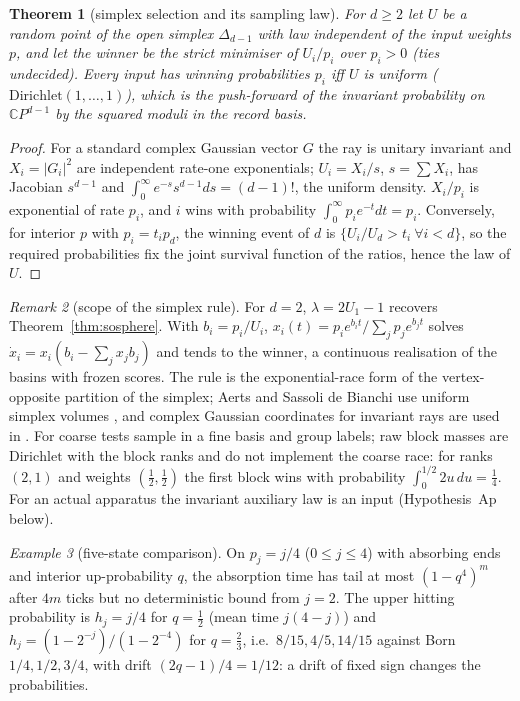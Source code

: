 \documentclass[aps,pra,onecolumn,superscriptaddress,nofootinbib,10pt]{revtex4-2}
\newtheorem{theorem}{Theorem}
\theoremstyle{definition}
\theoremstyle{remark}
\newtheorem{remark}[theorem]{Remark}
\newtheorem{example}[theorem]{Example}
\newcommand{\C}{\mathbb{C}}
\begin{document}
\begin{theorem}[simplex selection and its sampling law]\label{thm:sosimplex}
For $d\ge2$ let $U$ be a random point of the open simplex $\Delta_{d-1}$ with law independent of the input weights $p$, and let
the winner be the strict minimiser of $U_i/p_i$ over $p_i>0$ (ties undecided).  Every input has winning
probabilities $p_i$ iff $U$ is uniform ($\mathrm{Dirichlet}(1,\dots,1)$), which is the push-forward of the invariant probability on $\C P^{d-1}$
by the squared moduli in the record basis.
\end{theorem}
\begin{proof}
For a standard complex Gaussian vector $G$ the ray is unitary invariant and $X_i=\lvert G_i\rvert^2$ are independent rate-one
exponentials; $U_i=X_i/s$, $s=\sum X_i$, has Jacobian $s^{d-1}$ and $\int_0^\infty e^{-s}s^{d-1}ds=(d-1)!$, the uniform density.  $X_i/p_i$ is
exponential of rate $p_i$, and $i$ wins with probability $\int_0^\infty p_ie^{-t}dt=p_i$.  Conversely, for interior $p$ with $p_i=t_ip_d$,
the winning event of $d$ is $\{U_i/U_d>t_i\ \forall i<d\}$, so the required probabilities fix the joint survival function of
the ratios, hence the law of $U$.
\end{proof}

\begin{remark}[scope of the simplex rule]\label{rem:sobasinscope}
For $d=2$, $\lambda=2U_1-1$ recovers Theorem~\ref{thm:sosphere}.  With $b_i=p_i/U_i$, $x_i(t)=p_ie^{b_it}/\sum_jp_je^{b_jt}$ solves $\dot x_i=x_i(b_i-\sum_jx_jb_j)$
and tends to the winner, a continuous realisation of the basins with frozen scores.  The rule is the
exponential-race form of the vertex-opposite partition of the simplex; Aerts and Sassoli de Bianchi use
uniform simplex volumes \cite{n3:Aerts}, and complex Gaussian coordinates for invariant rays are used
in \cite{n3:Zyczkowski}.  For coarse tests sample in a fine basis and group labels; raw block masses are
$\mathrm{Dirichlet}$ with the block ranks and do not implement the coarse race: for ranks $(2,1)$ and weights $(\tfrac12,\tfrac12)$
the first block wins with probability $\int_0^{1/2}2u\,du=\tfrac14$.  For an actual apparatus the invariant auxiliary law is
an input (Hypothesis~Ap below).
\end{remark}

\begin{example}[five-state comparison]\label{ex:sochain}
On $p_j=j/4$ ($0\le j\le4$) with absorbing ends and interior up-probability $q$, the absorption time has tail at most
$(1-q^4)^m$ after $4m$ ticks but no deterministic bound from $j=2$.  The upper hitting probability is $h_j=j/4$ for $q=\tfrac12$
(mean time $j(4-j)$) and $h_j=(1-2^{-j})/(1-2^{-4})$ for $q=\tfrac23$, i.e.\ $8/15,4/5,14/15$ against Born $1/4,1/2,3/4$, with drift
$(2q-1)/4=1/12$: a drift of fixed sign changes the probabilities.
\end{example}
\end{document}
